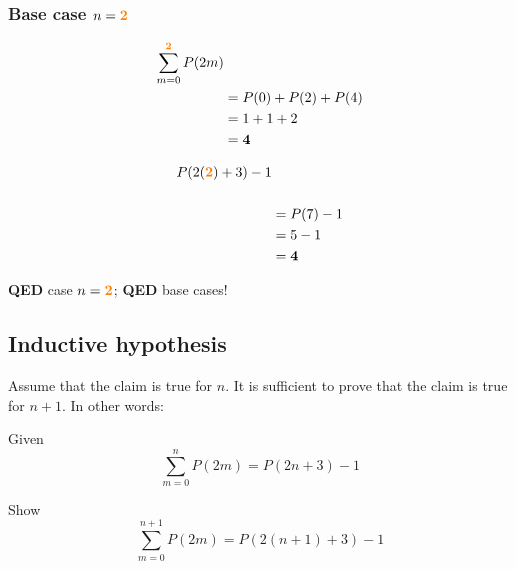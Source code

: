 \documentclass[11pt]{article}
\def \lf {\newline}
\def \subsorange [#1]{\mathbf{\textcolor{orange}{#1}}}
\begin{document}
\subsubsection*{Base case $n=\subsorange[2]$}
\begin{table}[h]
   \begin{subtable}[t]{0.45\textwidth}
      \begin{alignat*}{2}
         \sum_{m=0}^{\subsorange[2]}P(2m)& \\
            &=P(0)+P(2)+P(4) \\
            &=1+1+2 \\
            &=\mathbf{4} \\
      \end{alignat*}
   \end{subtable}
   \hfill
   \vline
   \hfill
   \begin{subtable}[t]{0.45\textwidth}
      \begin{alignat*}{2}
         P(2(\subsorange[2])+3)-1& \\
            \\
            &=P(7)-1 \\
            &=5-1 \\
            &=\mathbf{4} \\
      \end{alignat*}
   \end{subtable}
\end{table}
\textbf{QED} case $n=\subsorange[2]$; \textbf{QED} base cases!

\subsection*{Inductive hypothesis}
Assume that the claim is true for $n$. It is sufficient to prove that the claim is true for $n+1$. In other words:\lf

Given
\[
   \sum_{m=0}^{n} P(2m) = P(2n+3)-1
\]

Show
\[
   \sum_{m=0}^{n + 1} P(2m) = P(2(n+1)+3)-1
\]

\pagebreak
\end{document}
